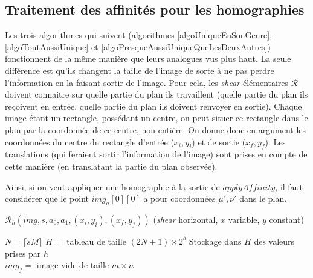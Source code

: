   
  \subsection*{Traitement des affinités pour les homographies}
  Les trois algorithmes qui suivent (algorithmes \ref{algoUniqueEnSonGenre}, \ref{algoToutAussiUnique} et \ref{algoPresqueAussiUniqueQueLesDeuxAutres}) fonctionnent de la même manière que leurs analogues vus plus haut. La seule différence est qu'ils changent la taille de l'image de sorte à ne pas perdre l'information en la faisant sortir de l'image. Pour cela, les \emph{shear} élémentaires $\mathcal R$ doivent connaitre sur quelle partie du plan ils travaillent (quelle partie du plan ils reçoivent en entrée, quelle partie du plan ils doivent renvoyer en sortie). Chaque image étant un rectangle, possédant un centre, on peut situer ce rectangle dans le plan par la coordonnée de ce centre, non entière. On donne donc en argument les coordonnées du centre du rectangle d'entrée ($x_i,y_i$) et de sortie ($x_f,y_f$). Les translations (qui feraient sortir l'information de l'image) sont prises en compte de cette manière (en translatant la partie du plan observée).
  
  Ainsi, si on veut appliquer une homographie à la sortie de $applyAffinity$, il faut considérer que le point $img_a[0][0]$ a pour coordonnées $\mu',\nu'$ dans le plan.
  
   \begin{algorithme}
    \label{algoUniqueEnSonGenre}
    \caption{$\mathcal{R}_h(img,s,a_0,a_1,(x_i,y_i),(x_f,y_f))$ (\textit{shear} horizontal, $x$ variable, $y$ constant)}
    $N = \lceil sM \rceil$\;
    $H = $ tableau de taille $(2N+1) \times 2^b$\;
    Stockage dans $H$ des valeurs prises par $h$\;\ \\
    $img_f = $ image vide de taille $m \times n$\;
   \end{algorithme}










